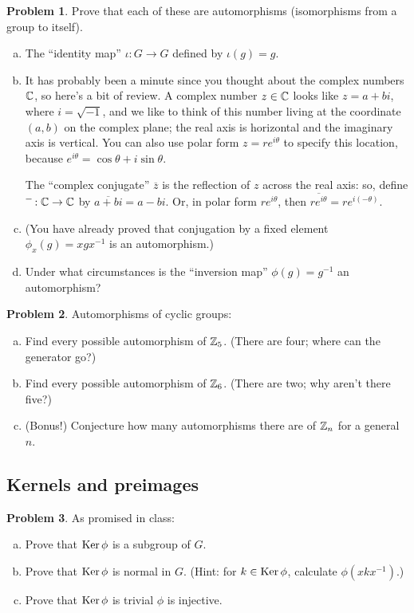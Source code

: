 \documentclass[12pt]{article}
\theoremstyle{definition} %
\newtheorem{problem}{Problem}
\newcommand\inv{^{-1}} %
\begin{document}
\begin{problem}
    Prove that each of these are automorphisms (isomorphisms from a group to itself).
    \begin{enumerate}[(a)]
        \item The ``identity map'' $\iota: G\to G$ defined by $\iota(g) = g$.
        \item It has probably been a minute since you thought about the complex numbers $\mathbb{C}$, so here's a bit of review. A complex number $z\in \mathbb{C}$ looks like $z=a+bi$, where $i = \sqrt{-1}$, and we like to think of this number living at the coordinate $(a, b)$ on the complex plane; the real axis is horizontal and the imaginary axis is vertical. You can also use polar form $z=re^{i\theta}$ to specify this location, because $e^{i\theta} = \cos\theta + i \sin\theta$.
        
        The ``complex conjugate'' $\overline{z}$ is the reflection of $z$ across the real axis: so,
        define $\overline{\phantom{z}}:\mathbb{C} \to \mathbb{C}$  by $\overline{a+bi} = a - bi$. Or, in polar form $re^{i\theta}$, then $\overline{re^{i\theta}} = re^{i(-\theta)}$.
        \item (You have already proved that conjugation by a fixed element $\phi_x(g) = xgx\inv$ is an automorphism.)
        \item Under what circumstances is the ``inversion map'' $\phi(g) = g\inv$ an automorphism?
    \end{enumerate}
\end{problem}

\begin{problem} Automorphisms of cyclic groups:
    \begin{enumerate}[(a)]
        \item Find every possible automorphism of $\mathbb{Z}_5$. (There are four; where can the generator go?)
        \item Find every possible automorphism of $\mathbb{Z}_6$. (There are two; why aren't there five?)
        \item (Bonus!) Conjecture how many automorphisms there are of $\mathbb{Z}_n$ for a general $n$.
    \end{enumerate}
\end{problem}

\subsection*{Kernels and preimages}

\begin{problem} As promised in class:
    \begin{enumerate}[(a)]
        \item Prove that $\operatorname{Ker}\phi$ is a subgroup of $G$.
        \item Prove that $\operatorname{Ker}\phi$ is normal in $G$. (Hint: for $k\in \operatorname{Ker}\phi$, calculate $\phi(xkx\inv)$.)
        \item Prove that $\operatorname{Ker}\phi$ is trivial  $\phi$ is injective.
    \end{enumerate}
\end{problem}
\end{document}
